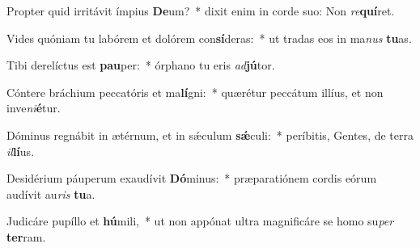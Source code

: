 \item Propter quid irritávit ímpius \textbf{De}um?~* dixit enim in corde suo: Non \textit{re}\textbf{quí}ret.
\item Vides quóniam tu labórem et dolórem con\textbf{sí}deras:~* ut tradas eos in ma\textit{nus} \textbf{tu}as.
\item Tibi derelíctus est \textbf{pau}per:~* órphano tu eris \textit{ad}\textbf{jú}tor.
\item Cóntere bráchium peccatóris et ma\textbf{lí}gni:~* quærétur peccátum illíus, et non inve\textit{ni}\textbf{é}tur.
\item Dóminus regnábit in ætérnum, et in sǽculum \textbf{sǽ}culi:~* períbitis, Gentes, de terra \textit{il}\textbf{lí}us.
\item Desidérium páuperum exaudívit \textbf{Dó}minus:~* præparatiónem cordis eórum audívit au\textit{ris} \textbf{tu}a.
\item Judicáre pupíllo et \textbf{hú}mili,~* ut non appónat ultra magnificáre se homo su\textit{per} \textbf{ter}ram.
